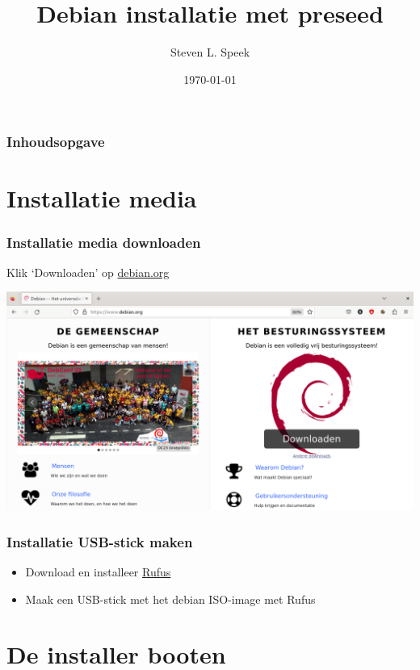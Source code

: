 \documentclass{beamer}
\title[Debian installatie] %
{Debian installatie met preseed}
\author[S.L.Speek] %
{Steven L. Speek}
\institute[ACC] %
{
  Actief Computer Centrum
}
\date[\today{}] %
{\today{}}
\begin{document}
\frame{\titlepage}


\begin{frame}
\frametitle{Inhoudsopgave}
\tableofcontents
\end{frame}


\section{Installatie media}

\begin{frame}
\frametitle{Installatie media downloaden}
Klik `Downloaden' op \href{https://debian.org}{debian.org}

\centering
\includegraphics[width=\textwidth]{img/debian-downloaden.png} 
\end{frame}

\begin{frame}
  \frametitle{Installatie USB-stick maken}
\begin{itemize}
    \item Download en installeer \href{https://rufus.ie}{Rufus}
    \item Maak een USB-stick met het debian ISO-image met Rufus
\end{itemize}
\end{frame}



\section{De installer booten}
\end{document}

